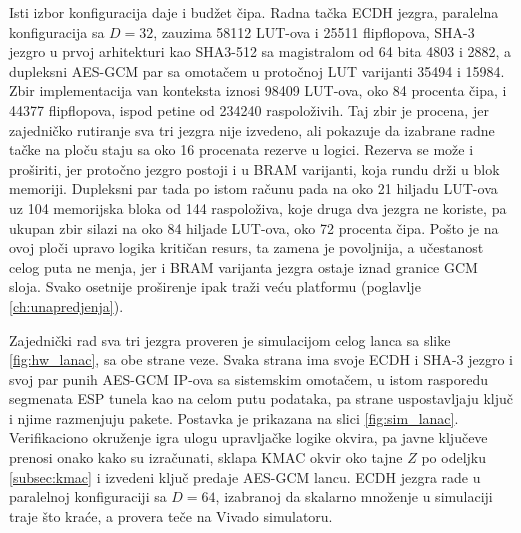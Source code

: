 \smallbreak
Isti izbor konfiguracija daje i budžet čipa. Radna tačka ECDH jezgra, paralelna konfiguracija sa $D = 32$, zauzima 58112 LUT-ova i 25511 flipflopova, SHA-3 jezgro u prvoj arhitekturi kao SHA3-512 sa magistralom od 64 bita 4803 i 2882, a dupleksni AES-GCM par sa omotačem u protočnoj LUT varijanti 35494 i 15984. Zbir implementacija van konteksta iznosi 98409 LUT-ova, oko 84 procenta čipa, i 44377 flipflopova, ispod petine od 234240 raspoloživih. Taj zbir je procena, jer zajedničko rutiranje sva tri jezgra nije izvedeno, ali pokazuje da izabrane radne tačke na ploču staju sa oko 16 procenata rezerve u logici. Rezerva se može i proširiti, jer protočno jezgro postoji i u BRAM varijanti, koja rundu drži u blok memoriji. Dupleksni par tada po istom računu pada na oko 21 hiljadu LUT-ova uz 104 memorijska bloka od 144 raspoloživa, koje druga dva jezgra ne koriste, pa ukupan zbir silazi na oko 84 hiljade LUT-ova, oko 72 procenta čipa. Pošto je na ovoj ploči upravo logika kritičan resurs, ta zamena je povoljnija, a učestanost celog puta ne menja, jer i BRAM varijanta jezgra ostaje iznad granice GCM sloja. Svako osetnije proširenje ipak traži veću platformu (poglavlje \ref{ch:unapredjenja}).

\smallbreak
Zajednički rad sva tri jezgra proveren je simulacijom celog lanca sa slike \ref{fig:hw_lanac}, sa obe strane veze. Svaka strana ima svoje ECDH i SHA-3 jezgro i svoj par punih AES-GCM IP-ova sa sistemskim omotačem, u istom rasporedu segmenata ESP tunela kao na celom putu podataka, pa strane uspostavljaju ključ i njime razmenjuju pakete. Postavka je prikazana na slici \ref{fig:sim_lanac}. Verifikaciono okruženje igra ulogu upravljačke logike okvira, pa javne ključeve prenosi onako kako su izračunati, sklapa KMAC okvir oko tajne $Z$ po odeljku \ref{subsec:kmac} i izvedeni ključ predaje AES-GCM lancu. ECDH jezgra rade u paralelnoj konfiguraciji sa $D = 64$, izabranoj da skalarno množenje u simulaciji traje što kraće, a provera teče na Vivado simulatoru.

